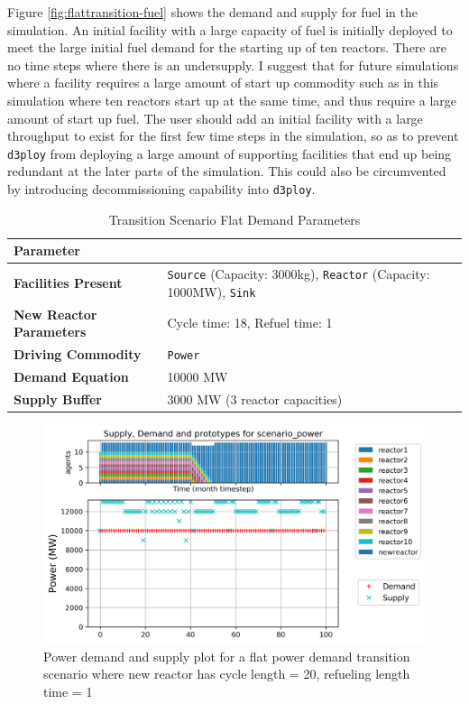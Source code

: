 \documentclass[11pt,letterpaper]{article}
\newcommand{\deploy}{\texttt{d3ploy}\xspace}%
\begin{document}
Figure \ref{fig:flattransition-fuel} shows the demand and supply 
for fuel in the simulation. 
An initial facility with a large capacity of fuel is initially
deployed to meet the large initial fuel demand for the starting
up of ten reactors. 
There are no time steps where there is an undersupply. 
I suggest that for future simulations where a facility requires a
large amount of start up commodity such as in this simulation 
where ten reactors start up at the same time, and thus require 
a large amount of start up fuel. 
The user should add an initial facility with a large throughput
to exist for the first few time steps in the simulation, so as 
to prevent \deploy from deploying a large amount of supporting
facilities that end up being redundant at the later parts of 
the simulation. 
This could also be circumvented by introducing decommissioning 
capability into \deploy.  

\begin{table}[!htbp]
	\centering
	\caption {Transition Scenario Flat Demand Parameters}
	\label{tab:transition-scenario-flat-power}
	\begin{tabular}{|l|p{6.5cm}|}
		\hline
		\textbf{Parameter} & \\
		\hline
		\textbf{Facilities Present} & \texttt{Source} (Capacity: 3000kg), \texttt{Reactor} (Capacity: 1000MW), \texttt{Sink} \\
		\hline
		\textbf{New Reactor Parameters} & Cycle time: 18, Refuel time: 1\\
		\hline
		\textbf{Driving Commodity} & \texttt{Power}\\
		\hline
		\textbf{Demand Equation} & 10000 MW \\
		\hline
		\textbf{Supply Buffer} & 3000 MW (3 reactor capacities)\\
		\hline
	\end{tabular}
\end{table}

\begin{figure}[!htbp]
	\begin{center}
		\includegraphics[scale=0.65]{figures/flattransition-power.png}
	\end{center}
        \caption{Power demand and supply plot for a flat power demand transition scenario where new reactor has cycle length = 20, refueling length time = 1}
	\label{fig:flattransition-power}
\end{figure}
\end{document}
